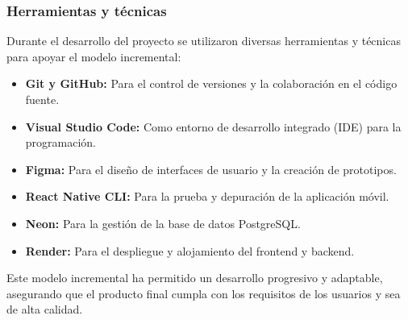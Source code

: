 \subsubsection{Herramientas y técnicas}

Durante el desarrollo del proyecto se utilizaron diversas herramientas y técnicas para apoyar el modelo incremental:

\begin{itemize}
    \item \textbf{Git y GitHub:} Para el control de versiones y la colaboración en el código fuente.
    \item \textbf{Visual Studio Code:} Como entorno de desarrollo integrado (IDE) para la programación.
    \item \textbf{Figma:} Para el diseño de interfaces de usuario y la creación de prototipos.
    \item \textbf{React Native CLI:} Para la prueba y depuración de la aplicación móvil.
    \item \textbf{Neon:} Para la gestión de la base de datos PostgreSQL.
    \item \textbf{Render:} Para el despliegue y alojamiento del frontend y backend.
\end{itemize}

Este modelo incremental ha permitido un desarrollo progresivo y adaptable, asegurando que el producto final cumpla con los requisitos de los usuarios y sea de alta calidad.